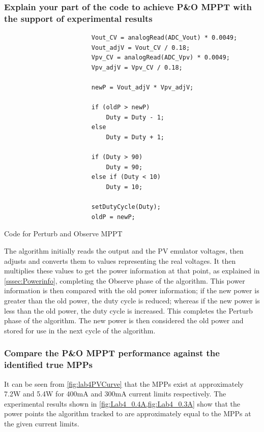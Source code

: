\documentclass[]{article}
\begin{document}
 			\subsubsection{Explain your part of the code to achieve P\&O MPPT with the support of experimental results}
 				\begin{listing}[H]
 					\begin{verbatim}
	 					Vout_CV = analogRead(ADC_Vout) * 0.0049;
	 					Vout_adjV = Vout_CV / 0.18;
	 					Vpv_CV = analogRead(ADC_Vpv) * 0.0049;
	 					Vpv_adjV = Vpv_CV / 0.18;
	 					
	 					newP = Vout_adjV * Vpv_adjV;
	 					
	 					if (oldP > newP)
	 						Duty = Duty - 1;
	 					else
	 						Duty = Duty + 1;
	 					
	 					if (Duty > 90)
	 						Duty = 90;
	 					else if (Duty < 10)
	 						Duty = 10;
	 					
	 					setDutyCycle(Duty);
	 					oldP = newP;	 					
 					\end{verbatim}
 					\caption{Code for Perturb and Observe MPPT}
 					\label{lst:MPPT}
 				\end{listing}
 				The algorithm initially reads the output and the PV emulator voltages, then adjusts and converts them to values representing the real voltages. It then multiplies these values to get the power information at that point, as explained in \cref{sssec:Powerinfo}, completing the Observe phase of the algorithm. This power information is then compared with the old power information; if the new power is greater than the old power, the duty cycle is reduced; whereas if the new power is less than the old power, the duty cycle is increased. This completes the Perturb phase of the algorithm. The new power is then considered the old power and stored for use in the next cycle of the algorithm.
 				
 			\subsubsection{Compare the P\&O MPPT performance against the identified true MPPs}
 				It can be seen from \cref{fig:lab4PVCurve} that the MPPs exist at approximately 7.2W and 5.4W for 400mA and 300mA current limits respectively. The experimental results shown in \cref{fig:Lab4_0.4A,fig:Lab4_0.3A} show that the power points the algorithm tracked to are approximately equal to the MPPs at the given current limits.
\end{document}
